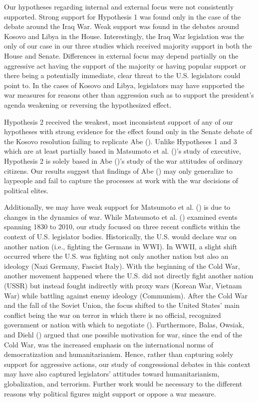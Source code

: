 \documentclass[jou,a4paper]{apa6}
\begin{document}
Our hypotheses regarding internal and external focus were not consistently supported. Strong support for Hypothesis 1 was found only in the case of the debate around the Iraq War. Weak support was found in the debates around Kosovo and Libya in the House. Interestingly, the Iraq War legislation was the only of our case in our three studies which received majority support in both the House and Senate. Differences in external focus may depend partially on the aggressive act having the support of the majority or having popular support or there being a potentially immediate, clear threat to the U.S. legislators could point to. In the cases of Kosovo and Libya, legislators may have supported the war measures for reasons other than aggression such as to support the president's agenda weakening or reversing the hypothesized effect.

Hypothesis 2 received the weakest, most inconsistent support of any of our hypotheses with strong evidence for the effect found only in the Senate debate of the Kosovo resolution failing to replicate Abe (\citeyear{Abe2012}). Unlike Hypotheses 1 and 3 which are at least partially based in Matsumoto et al. (\citeyear{Matsumoto2013})'s study of executive, Hypothesis 2 is solely based in Abe (\citeyear{Abe2012})'s study of the war attitudes of ordinary citizens. Our results suggest that findings of Abe (\citeyear{Abe2012}) may only generalize to laypeople and fail to capture the processes at work with the war decisions of political elites.

Additionally, we may have weak support for Matsumoto et al. (\citeyear{Matsumoto2013}) is due to changes in the dynamics of war. While Matsumoto et al. (\citeyear{Matsumoto2013}) examined events spanning 1830 to 2010, our study focused on three recent conflicts within the context of U.S. legislator bodies. Historically, the U.S. would declare war on another nation (i.e., fighting the Germans in WWI). In WWII, a slight shift occurred where the U.S. was fighting not only another nation but also an ideology (Nazi Germany, Fascist Italy). With the beginning of the Cold War, another movement happened where the U.S. did not directly fight another nation (USSR) but instead fought indirectly with proxy wars (Korean War, Vietnam War) while battling against enemy ideology (Communism). After the Cold War and the fall of the Soviet Union, the focus shifted to the United States' main conflict being the war on terror in which there is no official, recognized government or nation with which to negotiate (\cite{Matthews2014}). Furthermore, Balas, Owsiak, and Diehl (\citeyear{Balas2012}) argued that one possible motivation for war, since the end of the Cold War, was the increased emphasis on the international norms of democratization and humanitarianism. Hence, rather than capturing solely support for aggressive actions, our study of congressional debates in this context may have also captured legislators' attitudes toward humanitarianism, globalization, and terrorism. Further work would be necessary to the different reasons why political figures might support or oppose a war measure.
\end{document}
